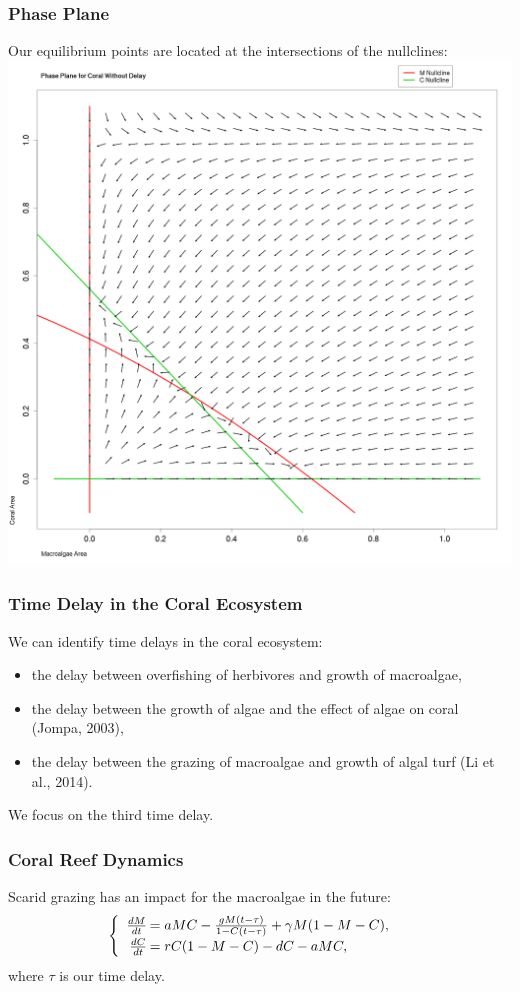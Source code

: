 \begin{frame}\frametitle{Phase Plane} 

  Our equilibrium points are located at the intersections of the nullclines:\\
  \includegraphics[scale=.1]{./nullclines.png}

\end{frame}



\begin{frame}
\frametitle{Time Delay in the Coral Ecosystem}

We can identify time delays in the coral ecosystem:
\begin{itemize}
\item the delay between overfishing of herbivores and growth of
  macroalgae,
\item the delay between the growth of algae and the effect of algae on
  coral (Jompa, 2003),
\item the delay between the grazing of macroalgae and growth of algal
  turf (Li et al., 2014).
\end{itemize} We focus on the third time delay.

\end{frame}


\begin{frame}\frametitle{Coral Reef Dynamics}
Scarid grazing has an impact for the macroalgae in the future:
$$\begin{cases}
  \begin{array}{rl}
    \frac{dM}{dt}\hspace{-.8em}&=aMC - \frac{gM(t-\tau)}{1-C(t-\tau)} + \gamma M (1-M-C),\\
    \frac{dC}{dt}\hspace{-.8em}&=rC(1-M-C) - dC - aMC,\\
  \end{array}
\end{cases}$$ where $\tau$ is our time delay.
\end{frame}


